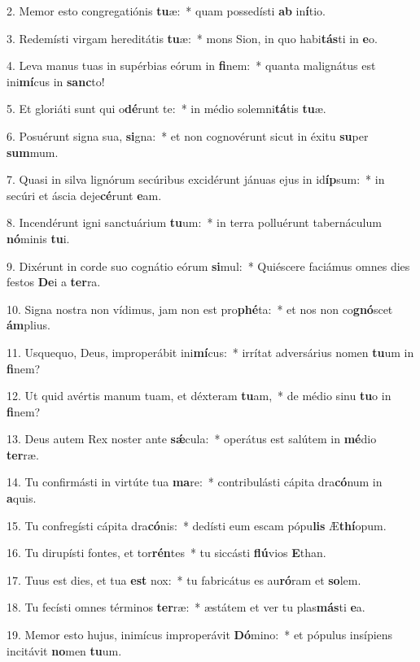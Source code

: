 2. Memor esto congregatiónis \textbf{tu}æ:~*  quam possedísti \textbf{ab} in\textbf{í}tio.\

3. Redemísti virgam hereditátis \textbf{tu}æ:~*  mons Sion, in quo habi\textbf{tás}ti in \textbf{e}o.\

4. Leva manus tuas in supérbias eórum in \textbf{fi}nem:~*  quanta malignátus est ini\textbf{mí}cus in \textbf{sanc}to!\

5. Et gloriáti sunt qui o\textbf{dé}runt te:~*  in médio solemni\textbf{tá}tis \textbf{tu}æ.\

6. Posuérunt signa sua, \textbf{si}gna:~*  et non cognovérunt sicut in éxitu \textbf{su}per \textbf{sum}mum.\

7. Quasi in silva lignórum secúribus excidérunt jánuas ejus in id\textbf{íp}sum:~*  in secúri et áscia deje\textbf{cé}runt \textbf{e}am.\

8. Incendérunt igni sanctuárium \textbf{tu}um:~*  in terra polluérunt tabernáculum \textbf{nó}minis \textbf{tu}i.\

9. Dixérunt in corde suo cognátio eórum \textbf{si}mul:~*  Quiéscere faciámus omnes dies festos \textbf{De}i a \textbf{ter}ra.\

10. Signa nostra non vídimus, jam non est pro\textbf{phé}ta:~*  et nos non co\textbf{gnó}scet \textbf{ám}plius.\

11. Usquequo, Deus, improperábit ini\textbf{mí}cus:~*  irrítat adversárius nomen \textbf{tu}um in \textbf{fi}nem?\

12. Ut quid avértis manum tuam, et déxteram \textbf{tu}am,~*  de médio sinu \textbf{tu}o in \textbf{fi}nem?\

13. Deus autem Rex noster ante \textbf{sǽ}cula:~*  operátus est salútem in \textbf{mé}dio \textbf{ter}ræ.\

14. Tu confirmásti in virtúte tua \textbf{ma}re:~*  contribulásti cápita dra\textbf{có}num in \textbf{a}quis.\

15. Tu confregísti cápita dra\textbf{có}nis:~*  dedísti eum escam pópu\textbf{lis} Æ\textbf{thí}opum.\

16. Tu dirupísti fontes, et tor\textbf{rén}tes~*  tu siccásti \textbf{flú}vios \textbf{E}than.\

17. Tuus est dies, et tua \textbf{est} nox:~*  tu fabricátus es au\textbf{ró}ram et \textbf{so}lem.\

18. Tu fecísti omnes términos \textbf{ter}ræ:~*  æstátem et ver tu plas\textbf{más}ti \textbf{e}a.\

19. Memor esto hujus, inimícus improperávit \textbf{Dó}mino:~*  et pópulus insípiens incitávit \textbf{no}men \textbf{tu}um.\


